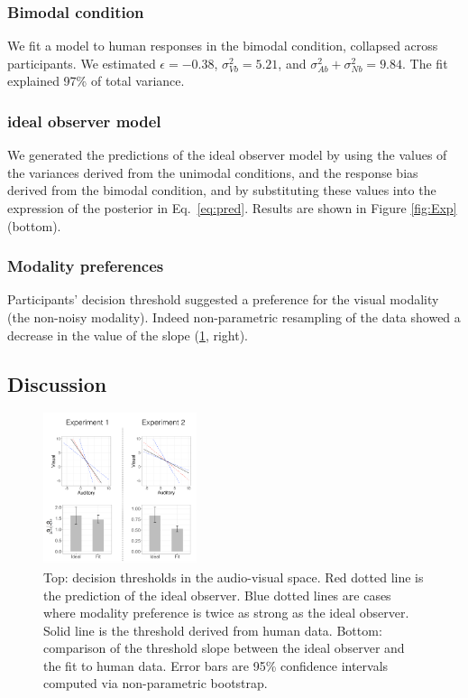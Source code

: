\documentclass[10pt,letterpaper]{article}
\begin{document}
\subsubsection{Bimodal condition}

We fit a model to human responses in the bimodal condition, collapsed across participants. We estimated $\epsilon=-0.38$, $\sigma^2_{Vb}=5.21$, and  $\sigma^2_{Ab}+\sigma^2_{Nb}=9.84$. The fit explained 97\% of total variance.

\subsubsection{ideal observer model}

We generated the predictions of the ideal observer model by using the values of the variances derived from the unimodal conditions, and the response bias derived from the bimodal condition, and by substituting these values into the expression of the posterior in Eq.~\ref{eq:pred}.
Results are shown in Figure \ref{fig:Exp} (bottom).

\subsubsection{Modality preferences}

Participants' decision threshold suggested a preference for the visual modality (the non-noisy modality). Indeed non-parametric resampling of the data showed a decrease in the value of the slope (\ref{fig:pref}, right).

\subsection{Discussion}

\begin{figure}[h]
\centering
\includegraphics[width=0.4\textwidth]{pictures/preference.png}
\caption{Top: decision thresholds in the audio-visual space. Red dotted line is the prediction of the ideal observer. Blue dotted lines are cases where modality preference is twice as strong as the ideal observer. Solid line is the threshold derived from human data. Bottom: comparison of the threshold slope between the ideal observer and the fit to human data. Error bars are 95\% confidence intervals computed via non-parametric bootstrap.}
\label{fig:pref}
\end{figure}
\end{document}
